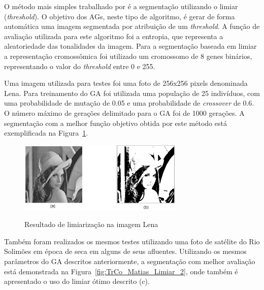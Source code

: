 \documentclass[12pt,oneside,a4paper,english,french,spanish,brazil,]{abntex2}
\begin{document}
O método mais simples trabalhado por \citet{matias:2007} é a segmentação utilizando o limiar (\textit{threshold}). O objetivo dos AGs, neste tipo de algoritmo, é gerar de forma automática uma imagem segmentada por atribuição de um \textit{threshold}. A função de avaliação utilizada para este algoritmo foi a entropia, que representa a aleatoriedade das tonalidades da imagem. Para a segmentação baseada em limiar a representação cromossômica foi utilizado um cromossomo de 8 genes binários, representando o valor do \textit{threshold} entre 0 e 255. 

Uma imagem utilizada para testes foi uma foto de 256x256 pixels denominada Lena. Para treinamento do GA foi utilizada uma população de 25 indivíduos, com uma probabilidade de mutação de 0.05 e uma probabilidade de \textit{crossover} de 0.6. O número máximo de gerações delimitado para o GA foi de 1000 gerações. A segmentação com a melhor função objetivo obtida por este método está exemplificada na Figura~\ref{fig:TrCo_Matias_Limiar_1}.

\begin{figure}[ht]
\centering
\caption{Resultado de limiarização na imagem Lena}
\includegraphics[width=0.7\textwidth]{imagens/TrCo_Matias_Limiar_1.PNG}
\label{fig:TrCo_Matias_Limiar_1}
\end{figure}

Também foram realizados os mesmos testes utilizando uma foto de satélite do Rio Solimões em época de seca em alguns de seus afluentes. Utilizando os mesmos parâmetros do GA descritos anteriormente, a segmentação com melhor avaliação está demonstrada na Figura~\ref{fig:TrCo_Matias_Limiar_2}, onde também é apresentado o uso do limiar ótimo descrito \cite{gonzalez:2012} (c).
\end{document}
